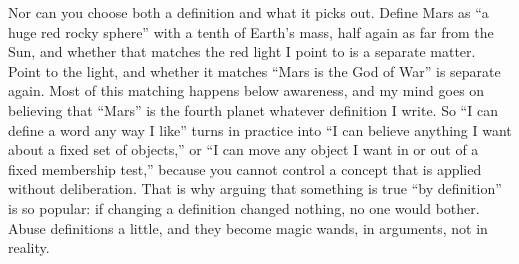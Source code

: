 Nor can you choose both a definition and what it picks out. Define Mars as ``a huge red rocky sphere'' with a tenth of Earth's mass, half again as far from the Sun, and whether that matches the red light I point to is a separate matter. Point to the light, and whether it matches ``Mars is the God of War'' is separate again. Most of this matching happens below awareness, and my mind goes on believing that ``Mars'' is the fourth planet whatever definition I write. So ``I can define a word any way I like'' turns in practice into ``I can believe anything I want about a fixed set of objects,'' or ``I can move any object I want in or out of a fixed membership test,'' because you cannot control a concept that is applied without deliberation. That is why arguing that something is true ``by definition'' is so popular: if changing a definition changed nothing, no one would bother. Abuse definitions a little, and they become magic wands, in arguments, not in reality.
